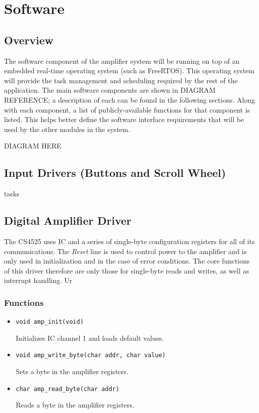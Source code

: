 \chapter{Software}

\section{Overview}

The software component of the amplifier system will be running on top of an embedded real-time operating system (such as FreeRTOS). This operating system will provide the task management and scheduling required by the rest of the application. The main software components are shown in DIAGRAM REFERENCE; a description of each can be found in the following sections. Along with each component, a list of publicly-available functions for that component is listed. This helps better define the software interface requirements that will be used by the other modules in the system.

DIAGRAM HERE

\section{Input Drivers (Buttons and Scroll Wheel)}

tasks

\section{Digital Amplifier Driver}
The CS4525 uses IC and a series of single-byte configuration registers for all of its communications. The \emph{Reset} line is used to control power to the amplifier and is only used in initialization and in the case of error conditions. The core functions of this driver therefore are only those for single-byte reads and writes, as well as interrupt handling. Ur

\subsection*{Functions}
\begin{itemize}
\item \verb|void amp_init(void)|

Initializes IC channel 1 and loads default values.

\item \verb|void amp_write_byte(char addr, char value)|

Sets a byte in the amplifier registers.

\item \verb|char amp_read_byte(char addr)|

Reads a byte in the amplifier registers.
\end{itemize}

